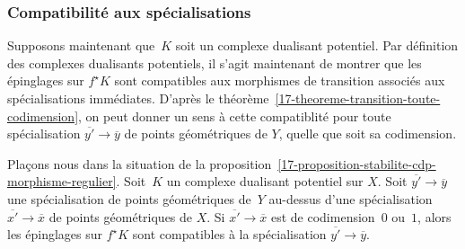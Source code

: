 \documentclass[10pt]{../fichiers-configuration-latex/smfart}
\begin{document}
\subsubsection{Compatibilité aux spécialisations}%

Supposons maintenant que $K$ soit un complexe dualisant potentiel.
Par définition des complexes dualisants potentiels, 
il s'agit maintenant de montrer que les épinglages sur $f^\star K$ sont
compatibles aux morphismes de transition associés aux spécialisations
immédiates. D'après le
théorème~\ref{17-theoreme-transition-toute-codimension}, on peut donner un
sens à cette compatiblité pour toute spécialisation
$\overline{y'}\to\overline y$ de points géométriques de $Y$, quelle que
soit sa codimension.

\begin{lemme3}\label{17-lemme-stabilite-cdp-morphisme-regulier}
Plaçons nous dans la situation de la
proposition~\ref{17-proposition-stabilite-cdp-morphisme-regulier}. Soit $K$ 
un complexe dualisant potentiel sur $X$. Soit ${\overline {y'}\to\overline y}$
une spécialisation de points géométriques de $Y$ au-dessus d'une
spécialisation $\overline {x'}\to\overline x$ de points géométriques de
$X$.
Si $\overline{x'}\to\overline x$ est de codimension $0$ ou $1$, alors les
épinglages sur $f^\star K$ sont compatibles à la spécialisation $\overline
{y'}\to\overline y$.
\end{lemme3}
\end{document}
